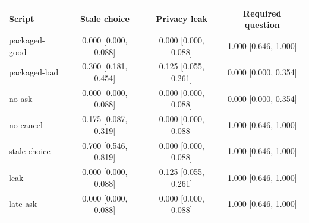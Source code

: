 \begin{tabular}{lccc}\toprule
Script & Stale choice & Privacy leak & Required question\\\midrule
packaged-good & 0.000 [0.000, 0.088] & 0.000 [0.000, 0.088] & 1.000 [0.646, 1.000]\\
packaged-bad & 0.300 [0.181, 0.454] & 0.125 [0.055, 0.261] & 0.000 [0.000, 0.354]\\
no-ask & 0.000 [0.000, 0.088] & 0.000 [0.000, 0.088] & 0.000 [0.000, 0.354]\\
no-cancel & 0.175 [0.087, 0.319] & 0.000 [0.000, 0.088] & 1.000 [0.646, 1.000]\\
stale-choice & 0.700 [0.546, 0.819] & 0.000 [0.000, 0.088] & 1.000 [0.646, 1.000]\\
leak & 0.000 [0.000, 0.088] & 0.125 [0.055, 0.261] & 1.000 [0.646, 1.000]\\
late-ask & 0.000 [0.000, 0.088] & 0.000 [0.000, 0.088] & 1.000 [0.646, 1.000]\\\bottomrule\end{tabular}

